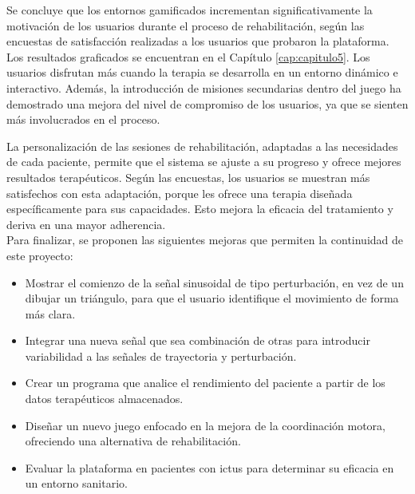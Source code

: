 Se concluye que los entornos gamificados incrementan significativamente la motivación de los usuarios durante el proceso de rehabilitación, según las encuestas de satisfacción realizadas a los usuarios que probaron la plataforma.
Los resultados graficados se encuentran en el Capítulo \ref{cap:capitulo5}.
Los usuarios disfrutan más cuando la terapia se desarrolla en un entorno dinámico e interactivo.
Además, la introducción de misiones secundarias dentro del juego ha demostrado una mejora del nivel de compromiso de los usuarios, ya que se sienten más involucrados en el proceso.

La personalización de las sesiones de rehabilitación, adaptadas a las necesidades de cada paciente, permite que el sistema se ajuste a su progreso y ofrece mejores resultados terapéuticos.
Según las encuestas, los usuarios se muestran más satisfechos con esta adaptación, porque les ofrece una terapia diseñada específicamente para sus capacidades.
Esto mejora la eficacia del tratamiento y deriva en una mayor adherencia.\\

Para finalizar, se proponen las siguientes mejoras que permiten la continuidad de este proyecto:
\begin{itemize}
    \item Mostrar el comienzo de la señal sinusoidal de tipo perturbación, en vez de un dibujar un triángulo, para que el usuario identifique el movimiento de forma más clara.
    \item Integrar una nueva señal que sea combinación de otras para introducir variabilidad a las señales de trayectoria y perturbación.
    \item Crear un programa que analice el rendimiento del paciente a partir de los datos terapéuticos almacenados. 
    \item Diseñar un nuevo juego enfocado en la mejora de la coordinación motora, ofreciendo una alternativa de rehabilitación.
    \item Evaluar la plataforma en pacientes con ictus para determinar su eficacia en un entorno sanitario.
\end{itemize}\